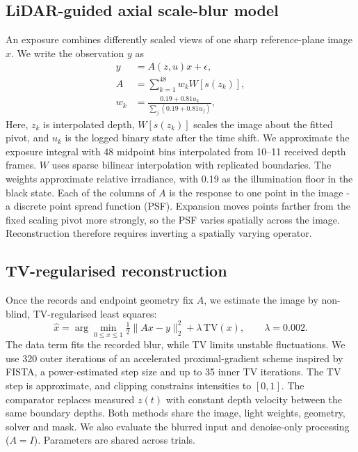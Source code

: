 \subsection{LiDAR-guided axial scale-blur model}
An exposure combines differently scaled views of one sharp reference-plane image $x$. We write the observation $y$ as
\begin{equation}
\begin{aligned}
y&=A(z,u)x+\epsilon,\\
A&=\sum_{k=1}^{48} w_k W[s(z_k)],\\
w_k&=\frac{0.19+0.81u_k}{\sum_j(0.19+0.81u_j)},
\end{aligned}
\label{eq:forward}
\end{equation}
Here, $z_k$ is interpolated depth, $W[s(z_k)]$ scales the image about the fitted pivot, and $u_k$ is the logged binary state after the time shift. We approximate the exposure integral with 48 midpoint bins interpolated from 10--11 received depth frames. $W$ uses sparse bilinear interpolation with replicated boundaries. The weights approximate relative irradiance, with 0.19 as the illumination floor in the black state. Each of the columns of $ A $ is the response to one point in the image - a discrete point spread function (PSF). Expansion moves points farther from the fixed scaling pivot more strongly, so the PSF varies spatially across the image. Reconstruction therefore requires inverting a spatially varying operator.

\subsection{TV-regularised reconstruction}
Once the records and endpoint geometry fix $A$, we estimate the image by non-blind, TV-regularised least squares:
\begin{equation}
\hat x=\arg\min_{0\leq x\leq1}\tfrac12\|Ax-y\|_2^2+\lambda\,\mathrm{TV}(x),
\qquad\lambda=0.002.
\label{eq:inverse}
\end{equation}
The data term fits the recorded blur, while TV limits unstable fluctuations. We use 320 outer iterations of an accelerated proximal-gradient scheme inspired by FISTA\cite{fista}, a power-estimated step size and up to 35 inner TV iterations. The TV step is approximate, and clipping constrains intensities to $[0,1]$. The comparator replaces measured $z(t)$ with constant depth velocity between the same boundary depths. Both methods share the image, light weights, geometry, solver and mask. We also evaluate the blurred input and denoise-only processing ($A=I$). Parameters are shared across trials.

